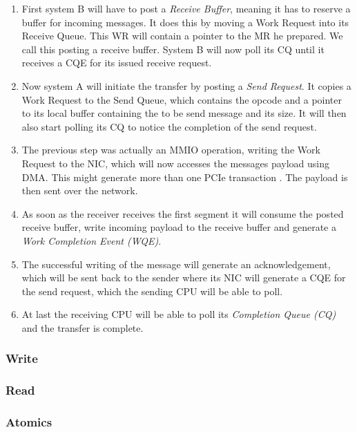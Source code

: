 \begin{enumerate}
  \item First system B will have to post a \emph{Receive Buffer}, meaning it has to reserve a buffer for incoming messages.
    It does this by moving a Work Request into its Receive Queue. This WR will contain a pointer to the MR he prepared. We
    call this posting a receive buffer. System B will now poll its CQ until it receives a CQE for its issued receive request.
  \item Now system A will initiate the transfer by posting a \emph{Send Request}. It copies a Work Request to the Send 
    Queue, which contains the  opcode and a pointer to its local buffer containing the to be send message
    and its size. It will then also start polling its CQ to notice the completion of the send request.
  \item The previous step was actually an MMIO operation, writing the Work Request to the NIC, which will now 
    accesses the messages payload using DMA. This  might generate more than one PCIe transaction \cite{atc16-kalia}. 
    The payload is then sent over the network.
  \item As soon as the receiver receives the first segment it will consume the posted receive buffer, write incoming payload 
    to the receive buffer and generate a \emph{Work Completion Event (WQE)}. 
  \item The successful writing of the message will generate an acknowledgement, which will be sent back to the sender where 
    its NIC will generate a CQE for the send request, which the sending CPU will be able to poll.
  \item At last the receiving CPU will be able to poll its \emph{Completion Queue (CQ)} and the transfer is complete.
\end{enumerate}






\subsubsection{Write} \label{sec:bg:write}
\subsubsection{Read}
\subsubsection{Atomics}
